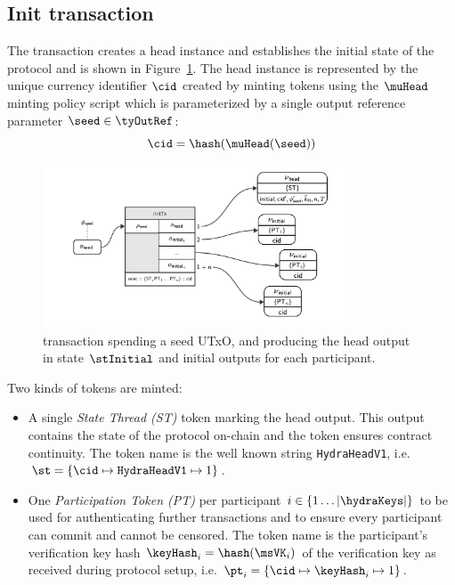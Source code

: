 \noindent {}

\subsection{Init transaction}\label{sec:init-tx}

The \mtxInit{} transaction creates a head instance and establishes the initial
state of the protocol and is shown in Figure~\ref{fig:initTx}. The head
instance is represented by the unique currency identifier $\cid$ created by
minting tokens using the $\muHead$ minting policy script which is parameterized
by a single output reference parameter $\seed \in \tyOutRef$:
\[
	\cid = \hash(\muHead(\seed))
\]

\begin{figure}
	\centering
        \includegraphics[width=0.8\textwidth]{Hydra/Protocol/Figures/initTx.pdf}
	\caption{\mtxInit{} transaction spending a seed UTxO, and producing the head
		output in state $\stInitial$ and initial outputs for each participant.}\label{fig:initTx}
\end{figure}

\noindent Two kinds of tokens are minted:
\begin{itemize}
	\item A single \emph{State Thread (ST)} token marking the head output. This
	      output contains the state of the protocol on-chain and the token ensures
	      contract continuity. The token name is the well known string
	      \texttt{HydraHeadV1}, i.e.
	      $\st = \{\cid \mapsto \texttt{HydraHeadV1} \mapsto 1\}$.
	\item One \emph{Participation Token (PT)} per participant
	      $i \in \{1 \dots |\hydraKeys|  \}$ to be used for authenticating further
	      transactions and to ensure every participant can commit and cannot be
	      censored. The token name is the participant's verification key hash
	      $\keyHash_{i} = \hash(\msVK_{i})$ of the verification key as received
	      during protocol setup, i.e.
	      $\pt_{i} = \{\cid \mapsto \keyHash_{i} \mapsto 1\}$.
\end{itemize}

